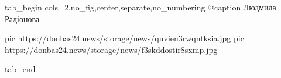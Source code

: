  
 
 
 
 


\ifcmt
  tab_begin cols=2,no_fig,center,separate,no_numbering
		 @caption Людмила Радіонова

     pic https://donbas24.news/storage/news/quvien3rwqntksia.jpg
		 pic https://donbas24.news/storage/news/f3skddostir8sxmp.jpg

  tab_end
\fi
